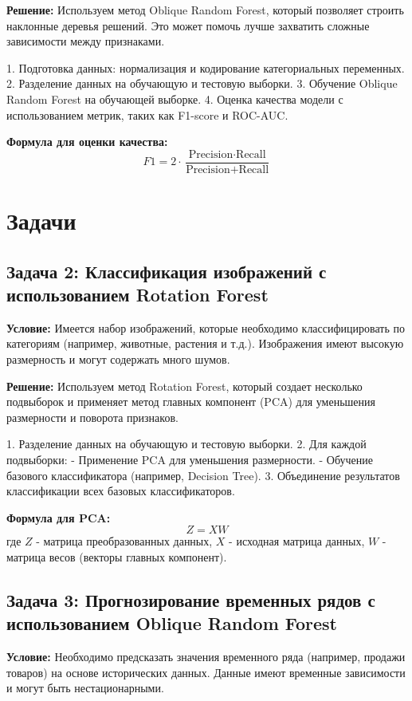 \textbf{Решение:}
Используем метод Oblique Random Forest, который позволяет строить наклонные деревья решений. Это может помочь лучше захватить сложные зависимости между признаками.

1. Подготовка данных: нормализация и кодирование категориальных переменных.
2. Разделение данных на обучающую и тестовую выборки.
3. Обучение Oblique Random Forest на обучающей выборке.
4. Оценка качества модели с использованием метрик, таких как F1-score и ROC-AUC.

\textbf{Формула для оценки качества:}
\[
F1 = 2 \cdot \frac{\text{Precision} \cdot \text{Recall}}{\text{Precision} + \text{Recall}}
\]

\section{Задачи}

\subsection*{Задача 2: Классификация изображений с использованием Rotation Forest}

\textbf{Условие:} 
Имеется набор изображений, которые необходимо классифицировать по категориям (например, животные, растения и т.д.). Изображения имеют высокую размерность и могут содержать много шумов.

\textbf{Решение:}
Используем метод Rotation Forest, который создает несколько подвыборок и применяет метод главных компонент (PCA) для уменьшения размерности и поворота признаков.

1. Разделение данных на обучающую и тестовую выборки.
2. Для каждой подвыборки:
   - Применение PCA для уменьшения размерности.
   - Обучение базового классификатора (например, Decision Tree).
3. Объединение результатов классификации всех базовых классификаторов.

\textbf{Формула для PCA:}
\[
Z = XW
\]
где \(Z\) - матрица преобразованных данных, \(X\) - исходная матрица данных, \(W\) - матрица весов (векторы главных компонент).

\subsection*{Задача 3: Прогнозирование временных рядов с использованием Oblique Random Forest}

\textbf{Условие:} 
Необходимо предсказать значения временного ряда (например, продажи товаров) на основе исторических данных. Данные имеют временные зависимости и могут быть нестационарными.

